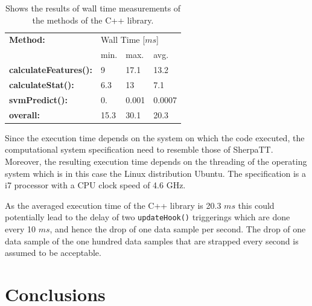 \documentclass{article}
\begin{document}
\begin{table}[htb!]
   \centering
    \caption{Shows the results of wall time measurements of the methods of the C++ library.}\label{fig:compmeasurments}
    \begin{tabularx}{\columnwidth}{X|XXX}
    \textbf{Method:} & \multicolumn{3}{X}{Wall Time [$ms$]} \\
    &min.&max.&avg.\\
    \hline
    \hline
\textbf{calculateFeatures():} & 9&  17.1& 13.2 \\
\textbf{calculateStat():}     & 6.3 & 13 & 7.1 \\
\textbf{svmPredict():}        &  0. &  0.001 & 0.0007  \\
\hline
\textbf{overall:}             & 15.3 & 30.1 &20.3  \\
    \end{tabularx}	
\end{table}

Since the execution time depends on the system on which the code executed, the computational system specification need to resemble those of SherpaTT. Moreover, the resulting execution time depends
on the threading of the operating system which is in this case the Linux distribution Ubuntu. The specification is a i7 processor with a CPU clock speed of 4.6 GHz. 

As the averaged execution time of the C++ library is 20.3 $ms$ this could potentially lead to the delay of two \texttt{updateHook()} triggerings which are done every 10 $ms$, and hence the drop of one data sample per second. The drop of one data sample of the one hundred data samples that are strapped every second is assumed to be acceptable.

\section{Conclusions}


\FloatBarrier



\end{document}
